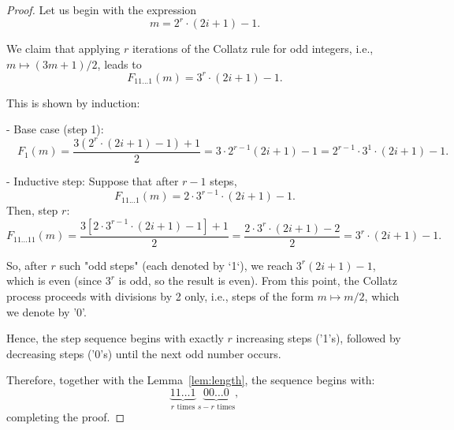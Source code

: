 \documentclass{amsart}
\theoremstyle{definition}
\theoremstyle{remark}
\numberwithin{equation}{section}
\begin{document}
\begin{proof}
	Let us begin with the expression
	\[
	m = 2^r \cdot (2i+1) - 1.
	\]
	
	We claim that applying \( r \) iterations of the Collatz rule for odd integers, i.e., \( m \mapsto (3m + 1)/2 \), leads to
	\[
	F_{11...1}(m) = 3^{r} \cdot (2i+1) - 1.
	\]
	
	This is shown by induction:
	
	- Base case (step 1):
	\[
	\quad F_1(m) = \frac{3(2^r \cdot (2i+1) - 1) + 1}{2} = 3 \cdot 2^{r-1} (2i+1) - 1 = 2^{r-1} \cdot 3^{1} \cdot (2i+1) - 1.
	\]
	
	- Inductive step:
	Suppose that after \( r-1 \) steps,
	\[
	F_{11...1}(m) = 2 \cdot 3^{r - 1} \cdot (2i+1) - 1.
	\]
	Then, step $r$:
	\[
	F_{11...11}(m) = \frac{3[2 \cdot 3^{r - 1} \cdot (2i+1) - 1] + 1}{2} = \frac{2 \cdot 3^{r} \cdot (2i+1) - 2}{2} = 3^{r} \cdot (2i+1) - 1.
	\]
	
	So, after \( r \) such "odd steps" (each denoted by `1`), we reach \( 3^{r} (2i+1) - 1 \), which is even (since \( 3^{r} \) is odd, so the result is even). From this point, the Collatz process proceeds with divisions by 2 only, i.e., steps of the form \( m \mapsto m/2 \), which we denote by '0'.
	
	Hence, the step sequence begins with exactly \( r \) increasing steps ('1's), followed by decreasing steps ('0's) until the next odd number occurs.
	
	Therefore, together with the Lemma~\ref{lem:length}, the sequence begins with:
	\[
	\underbrace{11\ldots1}_{r \text{ times}}\,\underbrace{00\ldots0}_{s - r \text{ times}},
	\]
	completing the proof.
\end{proof}
\end{document}
